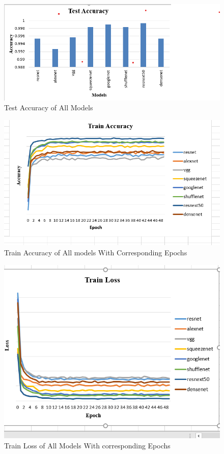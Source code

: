 \documentclass[a4paper,fleqn]{cas-sc}
\begin{document}
\begin{figure}[!ht]
\includegraphics[scale=0.75]{test Accuracy}
\caption{Test Accuracy of All Models}
\label{}
\end{figure}

\begin{figure}[!ht]
\includegraphics[scale=0.75]{Train Accuracy}
\caption{Train Accuracy of All models With  Corresponding Epochs}
\label{}
\end{figure}

\begin{figure}[!ht]
\includegraphics[scale=0.75]{Train Loss}
\caption{Train Loss of All Models With corresponding Epochs}
\label{}
\end{figure}
\end{document}
